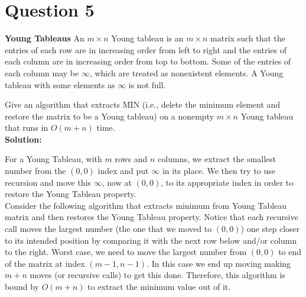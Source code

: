 \documentclass[11pt]{article}
\begin{document}
\clearpage
\section{Question 5} \textbf{Young Tableaus} An $m \times n$ Young tableau is an $m\times n$ matrix such that the entries of each row are in increasing order from left to right and the entries of each column are in increasing order from top to bottom. Some of the entries of each column may be $\infty$, which are treated as nonexistent elements. A Young tableau with some elements as $\infty$ is not full. 

Give an algorithm that extracts MIN (i.e., delete the minimum element and restore the matrix to be a Young tableau) on a nonempty $m\times n$ Young tableau that runs in $O(m+n)$ time. \\

\textbf{Solution:} 

For a Young Tableau, with $ m $ rows and $ n $ columns, we extract the smallest number from the $ (0,0) $ index and put $\infty$ in its place.  We then try to use recursion and move this $\infty$, now at $ (0,0) $, to its appropriate index in order to restore the Young Tableau property\cite{YoungTableau}. \\

Consider the following algorithm that extracts minimum from Young Tableau matrix and then restores the Young Tableau property. Notice that each recursive call moves the largest number (the one that we moved to $ (0,0) $) one step closer to its intended position by comparing it with the next row below and/or column to the right. Worst case, we need to move the largest number from $ (0,0) $ to end of the matrix at index $ (m-1, n-1) $. In this case we end up moving making $ m+n $ moves (or recursive calls) to get this done. Therefore, this algorithm is bound by $ O(m+n) $ to extract the minimum value out of it. \\
\end{document}
